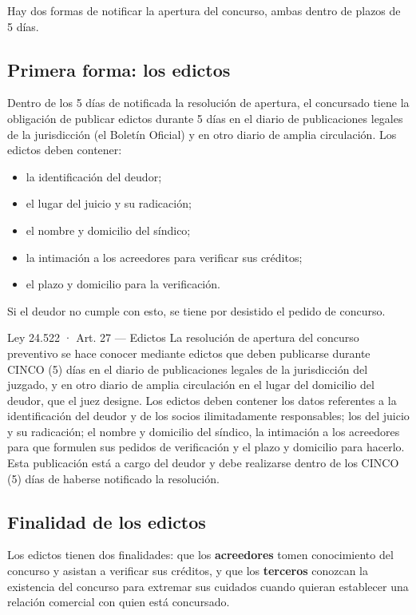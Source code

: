 \documentclass[12pt,oneside]{book}
\begin{document}
Hay dos formas de notificar la apertura del concurso, ambas dentro de plazos de 5 días.

\subsection{Primera forma: los edictos}

Dentro de los 5 días de notificada la resolución de apertura, el concursado tiene la obligación de publicar edictos durante 5 días en el diario de publicaciones legales de la jurisdicción (el Boletín Oficial) y en otro diario de amplia circulación. Los edictos deben contener:
\begin{itemize}
    \item la identificación del deudor;
    \item el lugar del juicio y su radicación;
    \item el nombre y domicilio del síndico;
    \item la intimación a los acreedores para verificar sus créditos;
    \item el plazo y domicilio para la verificación.
\end{itemize}
Si el deudor no cumple con esto, se tiene por desistido el pedido de concurso.

\begin{norma}{Ley 24.522 · Art. 27 — Edictos}
La resolución de apertura del concurso preventivo se hace conocer mediante edictos que deben publicarse durante CINCO (5) días en el diario de publicaciones legales de la jurisdicción del juzgado, y en otro diario de amplia circulación en el lugar del domicilio del deudor, que el juez designe. Los edictos deben contener los datos referentes a la identificación del deudor y de los socios ilimitadamente responsables; los del juicio y su radicación; el nombre y domicilio del síndico, la intimación a los acreedores para que formulen sus pedidos de verificación y el plazo y domicilio para hacerlo. Esta publicación está a cargo del deudor y debe realizarse dentro de los CINCO (5) días de haberse notificado la resolución.
\end{norma}

\subsection{Finalidad de los edictos}

Los edictos tienen dos finalidades: que los \textbf{acreedores} tomen conocimiento del concurso y asistan a verificar sus créditos, y que los \textbf{terceros} conozcan la existencia del concurso para extremar sus cuidados cuando quieran establecer una relación comercial con quien está concursado.
\end{document}
